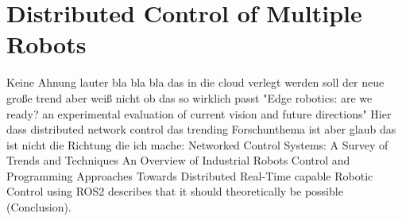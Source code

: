 \section{Distributed Control of Multiple Robots}

Keine Ahnung lauter bla bla bla das in die cloud verlegt werden soll der neue große trend aber weiß nicht ob das so wirklich passt "Edge robotics: are we ready? an experimental evaluation of current vision and future directions" \cite{groshev_edge_2023} \newline
Hier dass distributed network control das trending Forschunthema ist aber glaub das ist nicht die Richtung die ich mache: Networked Control Systems: A Survey of Trends and Techniques \cite{zhang_networked_2020} \newline
An Overview of Industrial Robots Control and Programming Approaches
Towards Distributed Real-Time capable Robotic Control using ROS2 describes that it should theoretically be possible (Conclusion).

